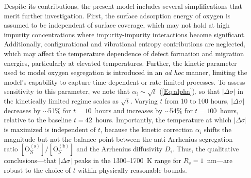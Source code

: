 \documentclass[preprint,12pt,sort&compress]{elsarticle}
\newcommand{\?}{\stackrel{?}{=}}
\begin{document}

Despite its contributions, the present model includes several simplifications that merit further investigation. First, the surface adsorption energy of oxygen is assumed to be independent of surface coverage, which may not hold at high impurity concentrations where impurity-impurity interactions become significant. Additionally, configurational and vibrational entropy contributions are neglected, which may affect the temperature dependence of defect formation and migration energies, particularly at elevated temperatures. Further, the kinetic parameter used to model oxygen segregation is introduced in an \textit{ad hoc} manner, limiting the model's capability to capture time-dependent or rate-limited processes. To assess sensitivity to this parameter, we note that $\alpha_i \sim \sqrt{t}$ (\cref{Eq:alpha}), so that $|\Delta \sigma|$ in the kinetically limited regime scales as $\sqrt{t}$. Varying $t$ from 10 to 100 hours, $|\Delta \sigma|$ decreases by $\sim$51\% for $t = 10$~hours and increases by $\sim$54\% for $t = 100$~hours, relative to the baseline $t = 42$~hours. Importantly, the temperature at which $|\Delta \sigma|$ is maximized is independent of $t$, because the kinetic correction $\alpha_i$ shifts the magnitude but not the balance point between the anti-Arrhenius segregation ratio $[\text{O}_\text{N}^{(\text{s})}]/[\text{O}_\text{N}^{(\text{b})}]$ and the Arrhenius diffusivity $D_i$. Thus, the qualitative conclusions---that $|\Delta \sigma|$ peaks in the 1300--1700~K range for $R_v = 1$~nm---are robust to the choice of $t$ within physically reasonable bounds.
\end{document}
